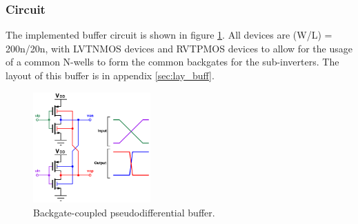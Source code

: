 		
		\subsubsection{Circuit}
		The implemented buffer circuit is shown in figure \ref{fig:pd_buffer_circuit}. All devices are (W/L) = 200n/20n, with LVTNMOS devices and RVTPMOS devices to allow for the usage of a common N-wells to form the common backgates for the sub-inverters. The layout of this buffer is in appendix \ref{sec:lay_buff}.
			\begin{figure}[htb!]
			        \centering
			        \includegraphics[width=0.4\textwidth, angle=0]{./figs/design/pseudiff_buffer}
			    \caption{Backgate-coupled pseudodifferential buffer.}
			    \label{fig:pd_buffer_circuit}
			\end{figure}




